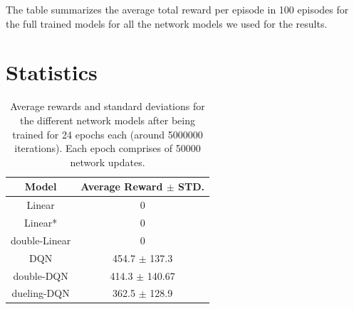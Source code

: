 \documentclass{article}
\begin{document}
The table summarizes the average total reward per episode in 100 episodes for the full trained models for all the network models we used for the results.

\section*{Statistics}
\begin{table}

\begin{center}
 \begin{tabular}{||c | c||} 
 \hline
 Model & Average Reward $\pm$ STD. \\ [0.5ex] 
 \hline\hline
 Linear & 0 \\ 
 \hline
 Linear* & 0 \\
 \hline
 double-Linear & 0 \\
 \hline
 DQN & 454.7 $\pm$ 137.3 \\
 \hline
 double-DQN & 414.3 $\pm$ 140.67 \\  
 \hline
 dueling-DQN & 362.5 $\pm$ 128.9 \\ 
 \hline
\end{tabular}
\end{center}
\caption{Average rewards and standard deviations for the different network models after being trained for 24 epochs each (around 5000000 iterations). Each epoch comprises of 50000 network updates.}
\end{table}
\end{document}

